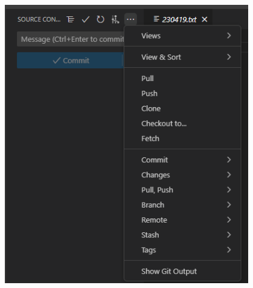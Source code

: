 \begin{figure}[ht]
    \begin{minipage}[c]{0.4\textwidth}
        \centering
        \includegraphics[width=0.95\textwidth]{image/git/github-source-con.png}
    \end{minipage}
    \begin{minipage}[c]{0.35\textwidth}
        \centering

\end{minipage}
\end{figure}
